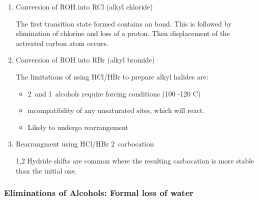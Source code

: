 \begin{enumerate}[label=\alph*)]

	\item Conversion of ROH into RCl (alkyl chloride)


		The first transition state formed contains an  bond. This
		is followed by elimination of chlorine and loss of a proton. Then
		 displacement of the activated carbon atom occurs.

	\item Conversion of ROH into RBr (alkyl bromide)


		The limitations of using HCl/HBr to prepare alkyl halides are:

		\begin{itemize}

			\item 2\de\ and 1\de\ alcohols require forcing conditions (100
				-120 \de C)

			\item incompatibility of any unsaturated sites, which will react.

			\item Likely to undergo rearrangement

		\end{itemize}

	\item Rearrangment using HCl/HBr 2\de\ carbocation


		1,2 Hydride shifts are common where the resulting carbocation is more
		stable than the initial one.

\end{enumerate}

\subsubsection{Eliminations of Alcohols: Formal loss of water}

